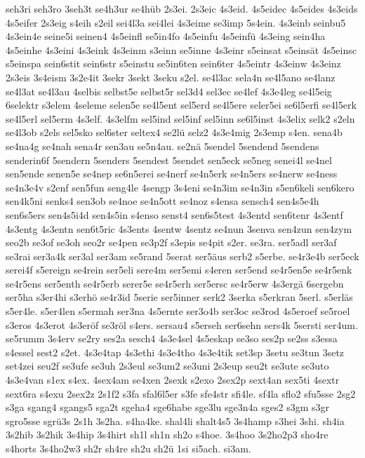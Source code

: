 {seh3ri
seh3ro
3seh3t
se4h3ur
se4hüb
2s3ei.
2s3eic
4s3eid.
4s5eidec
4s5eides
4s3eids
4s5eifer
2s3eig
s4eih
s2eil
sei4l3a
sei4lei
4s3eime
se3imp
5s4ein.
4s3einb
seinbu5
4s3ein4e
seine5i
seinen4
4s5einfl
se5in4fo
4s5einfu
4s5einfü
4s3eing
sein4ha
4s5einhe
4s3eini
4s3eink
4s3einm
s3einn
se5inne
4s3einr
s5einsat
s5einsät
4s5einsc
s5einspa
sein6stit
sein6str
s5einstu
se5in6ten
sein6ter
4s5eintr
4s3einw
4s3einz
2s3eis
3s4eism
3s2e4it
3sekr
3sekt
3seku
s2el.
se4l3ac
sela4n
se4l5ano
se4lanz
se4l3at
se4l3au
4selbis
selbst5e
selbst5r
sel3d4
sel3ec
se4lef
4s3e4leg
se4l5eig
6selektr
s3elem
4seleme
selen5e
se4l5ent
sel5erd
se4l5ere
seler5ei
se6l5erfi
se4l5erk
se4l5erl
sel5erm
4s3elf.
4s3elfm
sel5ind
sel5inf
sel5inn
se6l5inst
4s3elix
selk2
s2eln
se4l3ob
s2els
sel5sko
sel6ster
seltex4
se2lü
selz2
4s3e4mig
2s3emp
s4en.
sena4b
se4na4g
se4nah
sena4r
sen3au
se5n4au.
se2nä
5sendel
5sendend
5sendens
senderin6f
5sendern
5senders
5sendest
5sendet
sen5eck
se5neg
senei4l
se4nel
sen5ende
senen5e
se4nep
se6n5erei
se4nerf
se4n5erk
se4n5ers
se4nerw
se4ness
se4n3e4v
s2enf
sen5fun
seng4le
4sengp
3s4eni
se4n3im
se4n3in
s5en6keli
sen6kero
sen4k5ni
senks4
sen3ob
se4noe
se4n5ott
se4noz
s4ensa
sensch4
sen4s5e4h
sen6s5ers
sen4s5i4d
sen4s5in
s4enso
senst4
sen6s5test
4s3entd
sen6tenr
4s3entf
4s3entg
4s3entn
sen6t5ric
4s3ents
4sentw
4sentz
se4nun
3senva
sen4zun
sen4zym
seo2b
se3of
se3oh
seo2r
se4pen
se3p2f
s3epis
se4pit
s2er.
se3ra.
ser5adl
ser3af
se3rai
ser3a4k
ser3al
ser3am
se5rand
5serat
ser5äus
serb2
s5erbe.
se4r3e4b
ser5eck
serei4f
s5ereign
se4rein
ser5eli
sere4m
ser5emi
s4eren
ser5end
se4r5en5e
se4r5enk
se4r5ens
ser5enth
se4r5erb
serer5e
se4r5erh
ser5ersc
se4r5erw
4s3ergä
6sergebn
ser5ha
s3er4hi
s3erhö
se4r3id
5serie
ser5inner
serk2
3serka
s5erkran
5serl.
s5erläs
s5er4le.
s5er4len
s5ermah
ser3na
4s5ernte
ser3o4b
ser3oc
se3rod
4s5eroef
se5roel
s3eros
4s3erot
4s3eröf
se3röl
s4ers.
sersau4
s5erseh
ser6sehn
sers4k
5sersti
ser4um.
se5rumm
3s4erv
se2ry
ses2a
sesch4
4s3e4sel
4s5eskap
se3so
ses2p
se2ss
s3essa
s4essel
sest2
s2et.
4s3e4tap
4s3ethi
4s3e4tho
4s3e4tik
set3sp
3setu
se3tun
3setz
set4zei
seu2f
se3ufe
se3uh
2s3eul
se3um2
se3uni
2s3eup
seu2t
se3ute
se3uto
4s3e4van
s1ex
s4ex.
4sex4am
se4xen
2sexk
s2exo
2sex2p
sext4an
sex5ti
4sextr
sext6ra
s4exu
2sex2z
2s1f2
s3fa
sfal6l5er
s3fe
sfe4str
sfi4le.
sf4la
sflo2
sfu5sse
2sg2
s3ga
sgang4
sgangs5
sga2t
sgeha4
sge6habe
sge3lu
sge3n4a
sges2
s3gm
s3gr
sgro5sse
sgrü3s
2s1h
3s2ha.
s4ha4ke.
shal4li
shalt4s5
3s4hamp
s3hei
3shi.
sh4ia
3s2hib
3s2hik
3s4hip
3s4hirt
sh1l
sh1n
sh2o
s4hoe.
3s4hoo
3s2ho2p3
sho4re
s4horts
3s4ho2w3
sh2r
sh4re
sh2u
sh2ü
1si
si5ach.
si3am.
}
